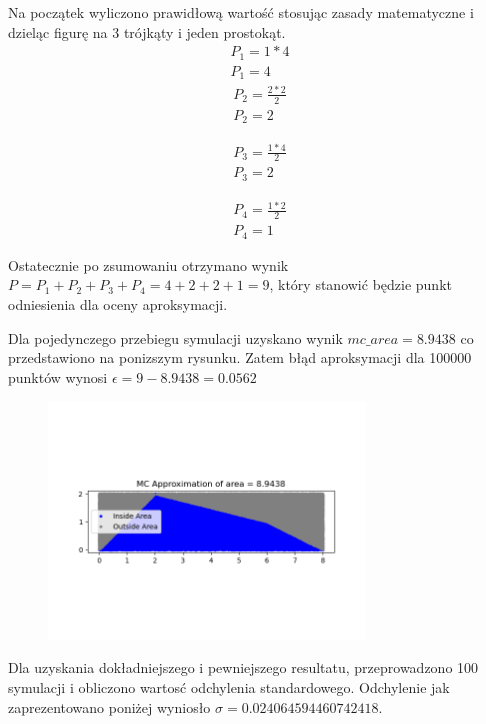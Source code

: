 \documentclass[12pt,oneside,a4paper]{book} %
\theoremstyle{break}
\begin{document}
Na początek wyliczono prawidłową wartość stosując zasady matematyczne i dzieląc figurę na 3 trójkąty i jeden prostokąt.
\begin{gather*}
  P_1 = 1 * 4\\
  P_1 = 4
\end{gather*}
\begin{gather*}
  P_2 = \frac{2 * 2}{2} \\
  P_2 = 2
\end{gather*}

\begin{gather*}
  P_3 = \frac{1 * 4}{2} \\
  P_3 = 2
\end{gather*}

\begin{gather*}
  P_4 = \frac{1 * 2}{2} \\
  P_4 = 1
\end{gather*}

Ostatecznie po zsumowaniu otrzymano wynik $P = P_1 + P_2 + P_3 + P_4 = 4 + 2 + 2 + 1 = 9$, który stanowić będzie punkt odniesienia dla oceny aproksymacji.

Dla pojedynczego przebiegu symulacji uzyskano wynik $mc\_area = 8.9438$ co przedstawiono na ponizszym rysunku. Zatem błąd aproksymacji dla 100000 punktów wynosi $\epsilon = 9 - 8.9438 = 0.0562$

\begin{figure}[H]
  \centering
  \includegraphics[width=0.75\textwidth]{area_aproximation_single_run.png}
\end{figure}

Dla uzyskania dokładniejszego i pewniejszego resultatu, przeprowadzono 100 symulacji i obliczono wartosć odchylenia standardowego. Odchylenie jak zaprezentowano poniżej wyniosło $\sigma = 0.024064594460742418$.
\end{document}
